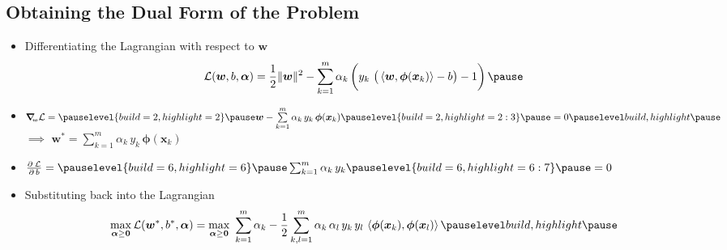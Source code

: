 \begin{slide}
\section[-2]{Obtaining the Dual Form of the Problem}

\begin{PauseHighLight}
  \begin{itemize}
  \item Differentiating the Lagrangian with respect to $\bm{w}$
    \begin{align*}
      \mathcal{L}(\bm{w}, b, \bm{\alpha}) = \frac{1}{2} \|\bm{w}\|^2 
      - \sum_{k=1}^m \alpha_k \left(\bigstrut
      y_k\,\left(\strut \inner{\bm{w}}{\bm{\phi}(\bm{x}_k) }-  b\right) - 1 \right)\pause
    \end{align*}
  \item $\gradw \mathcal{L}=\pauselevel{build =2, highlight =2} \pause\bm{w} -\sum\limits_{k=1}^m
    \alpha_k\,y_k\,\bm{\phi}(\bm{x}_k)\pauselevel{build =2, highlight =2 :3}\pause= 0\pauseb$ $\implies$ $\bm{w}^* = \sum\limits_{k=1}^m
  \alpha_k\, y_k\, \bm{\phi}(\bm{x}_k)$\pauseb
  \item $\pd{\mathcal{L}}{b}=\pauselevel{build =6, highlight =6}\pause
    \sum_{k=1}^m \alpha_k\,
    y_k\pauselevel{build =6, highlight  =6 :7}\pause=0$\pauseb
  \item Substituting back into the Lagrangian
   \begin{align*}
     \max_{\bm{\alpha}\geq\bm{0}}\mathcal{L}(\bm{w}^*, b^*, \bm{\alpha})
     = \max_{\bm{\alpha}\geq\bm{0}} \,\, \sum_{k=1}^m \alpha_k 
      - \frac{1}{2} \sum_{k,l=1}^m \alpha_k\,\alpha_l
      \,y_k\,y_l\, \inner{\bm{\phi}(\bm{x}_k)}{\bm{\phi}(\bm{x}_l)} \pauseb
    \end{align*}    
  \end{itemize}
\end{PauseHighLight}

\end{slide}


